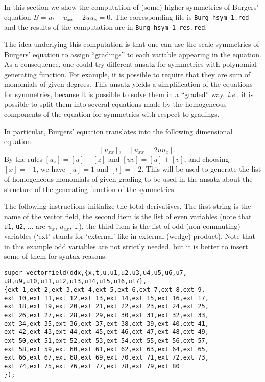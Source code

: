 In this section we show the computation of (some) higher symmetries of
Burgers' equation $B=u_t-u_{xx}+2uu_x=0$. The corresponding file is
\texttt{Burg\_hsym\_1.red} and the results of the computation are in
\texttt{Burg\_hsym\_1\_res.red}.

The idea underlying this computation is that one can use the scale symmetries
of Burgers' equation to assign ``gradings'' to each variable appearing in the
equation. As a consequence, one could try different ansatz for symmetries with
polynomial generating function. For example, it is possible to require that
they are sum of monomials of given degrees. This ansatz yields a simplification
of the equations for symmetries, because it is possible to solve them in a
``graded'' way, \emph{i.e.}, it is possible to split them into several
equations made by the homogeneous components of the equation for symmetries
with respect to gradings.

In particular, Burgers' equation translates into the following dimensional
equation:
\begin{displaymath}
  [u_t]=[u_{xx}],\quad [u_{xx}=2uu_x].
\end{displaymath}
By the rules $[u_z]=[u]-[z]$ and $[uv]=[u]+[v]$, and choosing $[x]=-1$, we have
$[u]=1$ and $[t]=-2$. This will be used to generate the list of homogeneous
monomials of given grading to be used in the ansatz about the structure of the
generating function of the symmetries.

The following instructions initialize the total derivatives. The first string
is the name of the vector field, the second item is the list of even variables
(note that \texttt{u1}, \texttt{u2}, ... are $u_x$, $u_{xx}$, \dots), the third
item is the list of odd (non-commuting) variables (`ext' stands for `external'
like in external (wedge) product). Note that in this example odd variables are
not strictly needed, but it is better to insert some of them for syntax reasons.
\begin{verbatim}
super_vectorfield(ddx,{x,t,u,u1,u2,u3,u4,u5,u6,u7,
u8,u9,u10,u11,u12,u13,u14,u15,u16,u17},
{ext 1,ext 2,ext 3,ext 4,ext 5,ext 6,ext 7,ext 8,ext 9,
ext 10,ext 11,ext 12,ext 13,ext 14,ext 15,ext 16,ext 17,
ext 18,ext 19,ext 20,ext 21,ext 22,ext 23,ext 24,ext 25,
ext 26,ext 27,ext 28,ext 29,ext 30,ext 31,ext 32,ext 33,
ext 34,ext 35,ext 36,ext 37,ext 38,ext 39,ext 40,ext 41,
ext 42,ext 43,ext 44,ext 45,ext 46,ext 47,ext 48,ext 49,
ext 50,ext 51,ext 52,ext 53,ext 54,ext 55,ext 56,ext 57,
ext 58,ext 59,ext 60,ext 61,ext 62,ext 63,ext 64,ext 65,
ext 66,ext 67,ext 68,ext 69,ext 70,ext 71,ext 72,ext 73,
ext 74,ext 75,ext 76,ext 77,ext 78,ext 79,ext 80
});
\end{verbatim}

